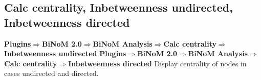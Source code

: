 \subsection{Calc centrality, Inbetweenness undirected, Inbetweenness directed}
\textbf{Plugins$\Rightarrow$BiNoM 2.0$\Rightarrow$BiNoM Analysis$\Rightarrow$Calc centrality$\Rightarrow$Inbetweenness undirected}
\textbf{Plugins$\Rightarrow$BiNoM 2.0$\Rightarrow$BiNoM Analysis$\Rightarrow$Calc centrality$\Rightarrow$Inbetweenness directed}
Display centrality of nodes in cases undirected and directed.



